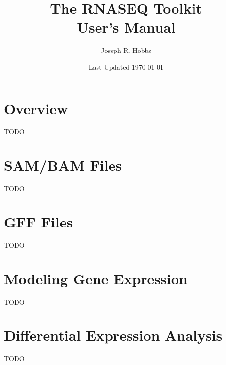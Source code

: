 \documentclass[12pt]{report}
\title{\Huge \textbf{The RNASEQ Toolkit} \\ \huge User's Manual}
\author{Joseph R. Hobbs}
\date{Last Updated \today}
\begin{document}
	\maketitle
	\tableofcontents
	
	\chapter{Overview}
	
	TODO
	
	\chapter{SAM/BAM Files}
	
	TODO
	
	\chapter{GFF Files}
	
	TODO
	
	\chapter{Modeling Gene Expression}
	
	TODO
	
	\chapter{Differential Expression Analysis}
	
	TODO
\end{document}
